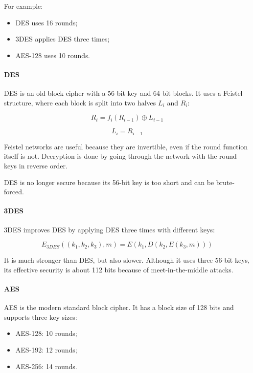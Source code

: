 For example:

\begin{itemize}
    \item DES uses 16 rounds;
    \item 3DES applies DES three times;
    \item AES-128 uses 10 rounds.
\end{itemize}

\paragraph{DES}

DES is an old block cipher with a 56-bit key and 64-bit blocks. It uses
a Feistel structure, where each block is split into two halves $L_i$ and
$R_i$:

\[
R_i = f_i(R_{i-1}) \oplus L_{i-1}
\]

\[
L_i = R_{i-1}
\]

Feistel networks are useful because they are invertible, even if the
round function itself is not. Decryption is done by going through the network with the round keys in reverse order.

DES is no longer secure because its 56-bit key is too short and can be
brute-forced.

\paragraph{3DES}

3DES improves DES by applying DES three times with different keys:

\[
E_{3DES}((k_1,k_2,k_3),m)
=
E(k_1, D(k_2, E(k_3,m)))
\]

It is much stronger than DES, but also slower. Although it uses three
56-bit keys, its effective security is about 112 bits because of
meet-in-the-middle attacks.

\paragraph{AES}

AES is the modern standard block cipher. It has a block size of 128 bits and supports three key sizes:

\begin{itemize}
    \item AES-128: 10 rounds;
    \item AES-192: 12 rounds;
    \item AES-256: 14 rounds.
\end{itemize}


